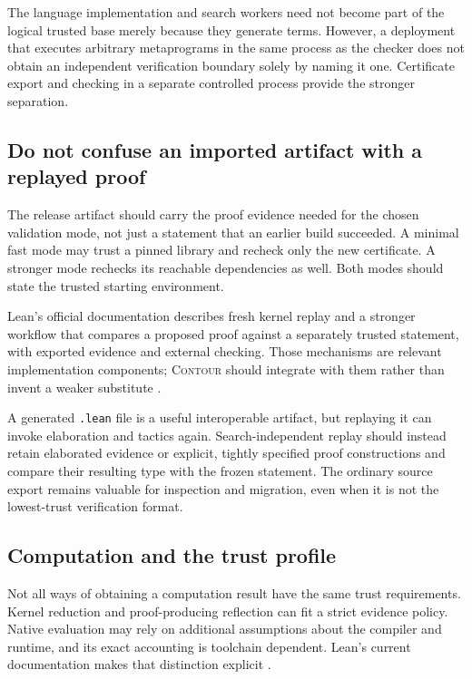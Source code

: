 \documentclass[11pt,a4paper]{article}
\newcommand{\codeid}[1]{\nolinkurl{#1}}
\newcommand{\contour}{\textsc{Contour}}
\begin{document}
The language implementation and search workers need not become part of the logical trusted base merely because they generate terms. However, a deployment that executes arbitrary metaprograms in the same process as the checker does not obtain an independent verification boundary solely by naming it one. Certificate export and checking in a separate controlled process provide the stronger separation.

\subsection{Do not confuse an imported artifact with a replayed proof}

The release artifact should carry the proof evidence needed for the chosen validation mode, not just a statement that an earlier build succeeded. A minimal fast mode may trust a pinned library and recheck only the new certificate. A stronger mode rechecks its reachable dependencies as well. Both modes should state the trusted starting environment.

Lean's official documentation describes fresh kernel replay and a stronger workflow that compares a proposed proof against a separately trusted statement, with exported evidence and external checking. Those mechanisms are relevant implementation components; \contour{} should integrate with them rather than invent a weaker substitute \cite{leanvalidation}.

A generated \codeid{.lean} file is a useful interoperable artifact, but replaying it can invoke elaboration and tactics again. Search-independent replay should instead retain elaborated evidence or explicit, tightly specified proof constructions and compare their resulting type with the frozen statement. The ordinary source export remains valuable for inspection and migration, even when it is not the lowest-trust verification format.

\subsection{Computation and the trust profile}

Not all ways of obtaining a computation result have the same trust requirements. Kernel reduction and proof-producing reflection can fit a strict evidence policy. Native evaluation may rely on additional assumptions about the compiler and runtime, and its exact accounting is toolchain dependent. Lean's current documentation makes that distinction explicit \cite{leantrust}.
\end{document}
